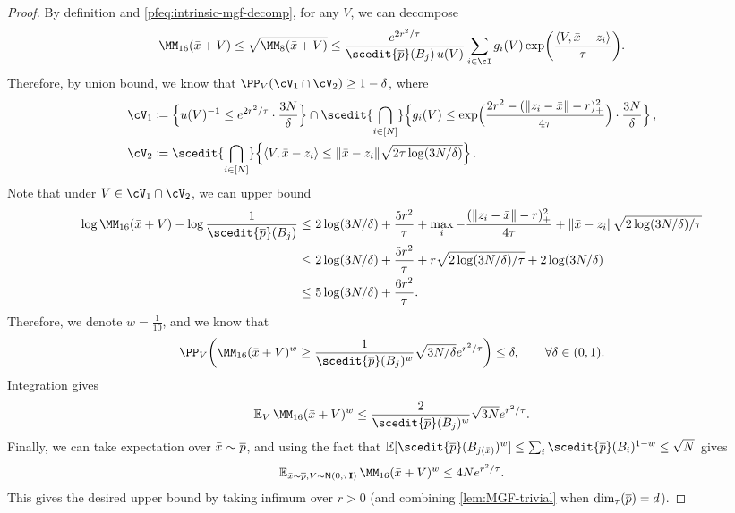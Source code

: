 \begin{proof}
By definition and \eqref{pfeq:intrinsic-mgf-decomp}, for any $V$, we can decompose
\begin{align*}
    \MM_{16}(\xbar+V)\leq\sqrt{\MM_{8}(\xbar+V)}
    \leq \frac{e^{2r^2/\tau}}{\scedit{\pbar}(B_j)\, u(V)}\sum_{i\in\cI} g_i(V)\exp\prn*{ \frac{\tri{V,\xbar-z_i}}{\tau} }.
\end{align*}
Therefore, by union bound, we know that $\PP_V(\cV_1\cap \cV_2)\geq 1-\delta$, where
\begin{align*}
    \cV_1 &\deq \crl[\Big]{ u(V)^{-1}\leq e^{2 r^2/\tau}\cdot \frac{3N}{\delta} } \cap \scedit{\bigcap_{i\in [N]}} \crl[\Big]{ g_i(V)\leq \exp\prn[\Big]{ \frac{2 r^2-(\nrm{z_i-\xbar}-r)_+^2}{4\tau} }\cdot \frac{3N}{\delta} }\,, \\
    \cV_2 &\deq \scedit{\bigcap_{i\in [N]}}\crl[\Big]{ \tri{V, \xbar-z_i}\leq \nrm{\xbar-z_i}\sqrt{2\tau\log(3N/\delta)}}\,.
\end{align*}
Note that under $V\in\cV_1\cap \cV_2$, we can upper bound
\begin{align*}
    \log \MM_{16}(\xbar+V)-\log \frac{1}{\scedit{\pbar}(B_j)}
    \leq&~ 2\log(3N/\delta)+\frac{5 r^2}{\tau}+\max_i -\frac{(\nrm{z_i-\xbar}-r)_+^2}{4\tau}+\nrm{\xbar-z_i}\sqrt{2 \log(3N/\delta)/\tau} \\
    \leq&~ 2\log(3N/\delta)+\frac{5 r^2}{\tau}+r\sqrt{2 \log(3N/\delta)/\tau} +2 \log(3N/\delta) \\
    \leq&~ 5 \log(3N/\delta)+\frac{6 r^2}{\tau}.
\end{align*}
Therefore, we denote $w=\frac{1}{10}$, and we know that
\begin{align*}
    \PP_V\prn*{ \MM_{16}(\xbar+V)^{w}
    \geq \frac{1}{\scedit{\pbar}(B_j)^w}\sqrt{3N/\delta} e^{r^2/\tau} }\leq \delta, \qquad\forall \delta\in(0,1).
\end{align*}
Integration gives
\begin{align*}
    \En_V \MM_{16}(\xbar+V)^{w} \leq \frac{2}{\scedit{\pbar}(B_{j})^w} \sqrt{3N}e^{r^2/\tau}.
\end{align*}
Finally, we can take expectation over $\bar{x}\sim \overline{p}$, and using the fact that $\En[\scedit{\pbar}(B_{j(\xbar)})^w]\leq \sum_i \scedit{\pbar}(B_i)^{1-w}\leq \sqrt{N}$ gives
\begin{align}
    \En_{\xbar\sim \pbar, V\sim\normal{0,\tau\Id}} \MM_{16}(\xbar+V)^{w}\leq 4Ne^{r^2/\tau}.
\end{align}
This gives the desired upper bound by taking infimum over $r>0$ (and combining \cref{lem:MGF-trivial} when $\dim_\tau(\overline{p})=d$).
\end{proof}

